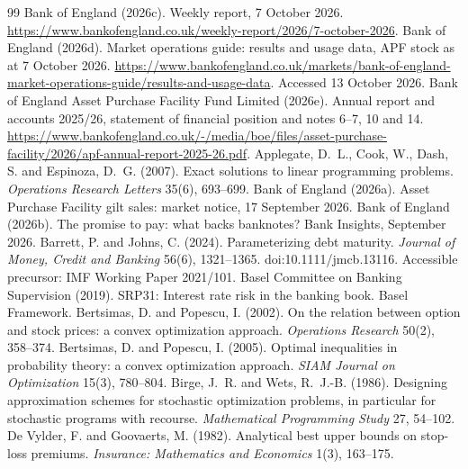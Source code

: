\documentclass[11pt,a4paper]{article}
\theoremstyle{remark}
\begin{document}
\begin{thebibliography}{99}\small
{} Bank of England (2026c). Weekly report, 7 October 2026. \url{https://www.bankofengland.co.uk/weekly-report/2026/7-october-2026}.
 Bank of England (2026d). Market operations guide: results and usage data, APF stock as at 7 October 2026. \url{https://www.bankofengland.co.uk/markets/bank-of-england-market-operations-guide/results-and-usage-data}. Accessed 13 October 2026.
 Bank of England Asset Purchase Facility Fund Limited (2026e). Annual report and accounts 2025/26, statement of financial position and notes 6--7, 10 and 14. \url{https://www.bankofengland.co.uk/-/media/boe/files/asset-purchase-facility/2026/apf-annual-report-2025-26.pdf}.
 Applegate, D.~L., Cook, W., Dash, S. and Espinoza, D.~G. (2007). Exact solutions to linear programming problems. \emph{Operations Research Letters} 35(6), 693--699.
 Bank of England (2026a). Asset Purchase Facility gilt sales: market notice, 17 September 2026.
 Bank of England (2026b). The promise to pay: what backs banknotes? Bank Insights, September 2026.
 Barrett, P. and Johns, C. (2024). Parameterizing debt maturity. \emph{Journal of Money, Credit and Banking} 56(6), 1321--1365. doi:10.1111/jmcb.13116. Accessible precursor: IMF Working Paper 2021/101.
 Basel Committee on Banking Supervision (2019). SRP31: Interest rate risk in the banking book. Basel Framework.
 Bertsimas, D. and Popescu, I. (2002). On the relation between option and stock prices: a convex optimization approach. \emph{Operations Research} 50(2), 358--374.
 Bertsimas, D. and Popescu, I. (2005). Optimal inequalities in probability theory: a convex optimization approach. \emph{SIAM Journal on Optimization} 15(3), 780--804.
 Birge, J.~R. and Wets, R.~J.-B. (1986). Designing approximation schemes for stochastic optimization problems, in particular for stochastic programs with recourse. \emph{Mathematical Programming Study} 27, 54--102.
 De Vylder, F. and Goovaerts, M. (1982). Analytical best upper bounds on stop-loss premiums. \emph{Insurance: Mathematics and Economics} 1(3), 163--175.

\end{thebibliography}
\end{document}
